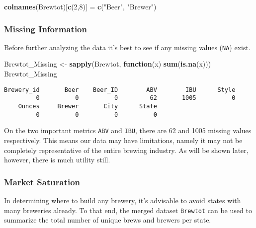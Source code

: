\documentclass[]{article}
\newenvironment{Shaded}{\begin{snugshade}}{\end{snugshade}}
\newcommand{\ControlFlowTok}[1]{\textcolor[rgb]{0.13,0.29,0.53}{\textbf{#1}}}
\newcommand{\DecValTok}[1]{\textcolor[rgb]{0.00,0.00,0.81}{#1}}
\newcommand{\KeywordTok}[1]{\textcolor[rgb]{0.13,0.29,0.53}{\textbf{#1}}}
\newcommand{\NormalTok}[1]{#1}
\newcommand{\StringTok}[1]{\textcolor[rgb]{0.31,0.60,0.02}{#1}}
\begin{document}
\begin{Shaded}
\begin{Highlighting}[]
\KeywordTok{colnames}\NormalTok{(Brewtot)[}\KeywordTok{c}\NormalTok{(}\DecValTok{2}\NormalTok{,}\DecValTok{8}\NormalTok{)] =}\StringTok{ }\KeywordTok{c}\NormalTok{(}\StringTok{"Beer"}\NormalTok{, }\StringTok{"Brewer"}\NormalTok{)}
\end{Highlighting}
\end{Shaded}

\hypertarget{missing-information}{%
\subsubsection{Missing Information}\label{missing-information}}

Before further analyzing the data it's best to see if any missing values
(\texttt{NA}) exist.

\begin{Shaded}
\begin{Highlighting}[]
\NormalTok{Brewtot_Missing <-}\StringTok{ }\KeywordTok{sapply}\NormalTok{(Brewtot, }\ControlFlowTok{function}\NormalTok{(x) }\KeywordTok{sum}\NormalTok{(}\KeywordTok{is.na}\NormalTok{(x)))}
\NormalTok{Brewtot_Missing}
\end{Highlighting}
\end{Shaded}

\begin{verbatim}
Brewery_id       Beer    Beer_ID        ABV        IBU      Style 
         0          0          0         62       1005          0 
    Ounces     Brewer       City      State 
         0          0          0          0 
\end{verbatim}

On the two important metrics \texttt{ABV} and \texttt{IBU}, there are 62
and 1005 missing values respectively. This means our data may have
limitations, namely it may not be completely representative of the
entire brewing industry. As will be shown later, however, there is much
utility still.

\hypertarget{market-saturation}{%
\subsubsection{Market Saturation}\label{market-saturation}}

In determining where to build any brewery, it's advisable to avoid
states with many breweries already. To that end, the merged dataset
\texttt{Brewtot} can be used to summarize the total number of unique
brews and brewers per state.
\end{document}
